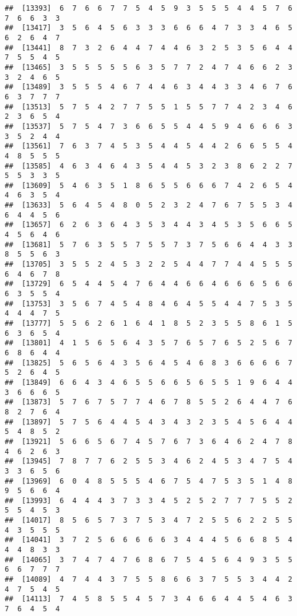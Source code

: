 \documentclass[
]{book}
\begin{document}
\begin{verbatim}
##  [13393]  6  7  6  6  7  7  5  4  5  9  3  5  5  5  4  4  5  7  6  7  6  6  3  3
##  [13417]  3  5  6  4  5  6  3  3  3  6  6  6  4  7  3  3  4  6  5  6  2  6  4  7
##  [13441]  8  7  3  2  6  4  4  7  4  4  6  3  2  5  3  5  6  4  4  7  5  5  4  5
##  [13465]  3  5  5  5  5  5  6  3  5  7  7  2  4  7  4  6  6  2  3  3  2  4  6  5
##  [13489]  3  5  5  5  4  6  7  4  4  6  3  4  4  3  3  4  6  7  6  6  3  7  7  7
##  [13513]  5  7  5  4  2  7  7  5  5  1  5  5  7  7  4  2  3  4  6  2  3  6  5  4
##  [13537]  5  7  5  4  7  3  6  6  5  5  4  4  5  9  4  6  6  6  3  3  5  2  4  4
##  [13561]  7  6  3  7  4  5  3  5  4  4  5  4  4  2  6  6  5  5  4  4  8  5  5  5
##  [13585]  4  6  3  4  6  4  3  5  4  4  5  3  2  3  8  6  2  2  7  5  5  3  3  5
##  [13609]  5  4  6  3  5  1  8  6  5  5  6  6  6  7  4  2  6  5  4  4  6  3  5  4
##  [13633]  5  6  4  5  4  8  0  5  2  3  2  4  7  6  7  5  5  3  4  6  4  4  5  6
##  [13657]  6  2  6  3  6  4  3  5  3  4  4  3  4  5  3  5  6  6  5  4  5  6  4  6
##  [13681]  5  7  6  3  5  5  7  5  5  7  3  7  5  6  6  4  4  3  3  8  5  5  6  3
##  [13705]  3  5  5  2  4  5  3  2  2  5  4  4  7  7  4  4  5  5  5  6  4  6  7  8
##  [13729]  6  5  4  4  5  4  7  6  4  4  6  6  4  6  6  6  5  6  6  6  3  5  5  4
##  [13753]  3  5  6  7  4  5  4  8  4  6  4  5  5  4  4  7  5  3  5  4  4  4  7  5
##  [13777]  5  5  6  2  6  1  6  4  1  8  5  2  3  5  5  8  6  1  5  6  3  6  5  4
##  [13801]  4  1  5  6  5  6  4  3  5  7  6  5  7  6  5  2  5  6  7  6  8  6  4  4
##  [13825]  5  6  5  6  4  3  5  6  4  5  4  6  8  3  6  6  6  6  7  5  2  6  4  5
##  [13849]  6  6  4  3  4  6  5  5  6  6  5  6  5  5  1  9  6  4  4  3  6  6  6  5
##  [13873]  5  7  6  7  5  7  7  4  6  7  8  5  5  2  6  4  4  7  6  8  2  7  6  4
##  [13897]  5  7  5  6  4  4  5  4  3  4  3  2  3  5  4  5  6  4  4  5  4  8  5  2
##  [13921]  5  6  6  5  6  7  4  5  7  6  7  3  6  4  6  2  4  7  8  4  6  2  6  3
##  [13945]  7  8  7  7  6  2  5  5  3  4  6  2  4  5  3  4  7  5  4  3  3  6  5  6
##  [13969]  6  0  4  8  5  5  5  4  6  7  5  4  7  5  3  5  1  4  8  9  5  6  6  4
##  [13993]  6  4  4  4  3  7  3  3  4  5  2  5  2  7  7  7  5  5  2  5  5  4  5  3
##  [14017]  8  5  6  5  7  3  7  5  3  4  7  2  5  5  6  2  2  5  5  4  3  5  5  5
##  [14041]  3  7  2  5  6  6  6  6  6  3  4  4  4  5  6  6  8  5  4  4  4  8  3  3
##  [14065]  3  7  4  7  4  7  6  8  6  7  5  4  5  6  4  9  3  5  5  6  6  7  7  7
##  [14089]  4  7  4  4  3  7  5  5  8  6  6  3  7  5  5  3  4  4  2  4  7  5  4  5
##  [14113]  7  4  5  8  5  5  4  5  7  3  4  6  6  4  4  5  4  6  3  7  6  4  5  4

\end{verbatim}
\end{document}
